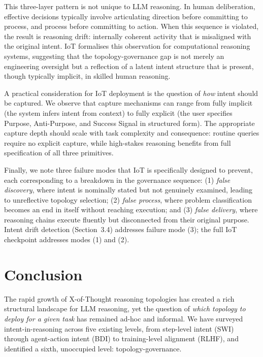 \documentclass[11pt,a4paper]{article}
\begin{document}
This three-layer pattern is not unique to LLM reasoning. In human deliberation, effective decisions typically involve articulating direction before committing to process, and process before committing to action. When this sequence is violated, the result is reasoning drift: internally coherent activity that is misaligned with the original intent. IoT formalises this observation for computational reasoning systems, suggesting that the topology-governance gap is not merely an engineering oversight but a reflection of a latent intent structure that is present, though typically implicit, in skilled human reasoning.

A practical consideration for IoT deployment is the question of \emph{how} intent should be captured. We observe that capture mechanisms can range from fully implicit (the system infers intent from context) to fully explicit (the user specifies Purpose, Anti-Purpose, and Success Signal in structured form). The appropriate capture depth should scale with task complexity and consequence: routine queries require no explicit capture, while high-stakes reasoning benefits from full specification of all three primitives.

Finally, we note three failure modes that IoT is specifically designed to prevent, each corresponding to a breakdown in the governance sequence: (1) \emph{false discovery}, where intent is nominally stated but not genuinely examined, leading to unreflective topology selection; (2) \emph{false process}, where problem classification becomes an end in itself without reaching execution; and (3) \emph{false delivery}, where reasoning chains execute fluently but disconnected from their original purpose. Intent drift detection (Section~3.4) addresses failure mode (3); the full IoT checkpoint addresses modes (1) and (2).

\section{Conclusion}

The rapid growth of X-of-Thought reasoning topologies has created a rich structural landscape for LLM reasoning, yet the question of \emph{which topology to deploy for a given task} has remained ad-hoc and informal. We have surveyed intent-in-reasoning across five existing levels, from step-level intent (SWI) through agent-action intent (BDI) to training-level alignment (RLHF), and identified a sixth, unoccupied level: topology-governance.
\end{document}

